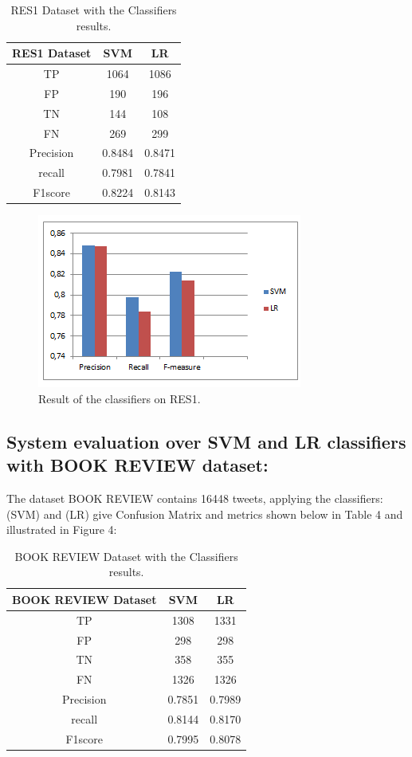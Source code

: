 \documentclass[conference]{IEEEtran}
\begin{document}
\begin{table}[!ht]
	\large        %
	\caption{RES1 Dataset with the Classifiers results.}\label{label}
	\centering    %
	\begin{tabular}{|c|c|c|}
		\hline
		RES1 Dataset&SVM&LR\\     %
		\hline
		TP&1064&1086\\
		\hline
		FP&190&196\\
		\hline
		TN&144&108\\
		\hline
		FN&269&299\\
		\hline
		Precision&0.8484&0.8471\\
		\hline
		recall&0.7981&0.7841\\
		\hline
		F1score&0.8224&0.8143\\
		\hline
	\end{tabular}
\end{table}

\begin{figure}[htbp]
	
	\centerline{\includegraphics{fig3.png}}
	\caption{Result of the classifiers on RES1.}
	\label{fig}
		\end{figure}
\subsection{System evaluation over SVM and LR classifiers with BOOK REVIEW dataset:}\label{AA}
The dataset BOOK REVIEW contains 16448 tweets, applying the classifiers: (SVM) and (LR) give Confusion Matrix and metrics shown below in Table 4 and illustrated in Figure 4:


\begin{table}[!ht]
	\large        %
	\caption{BOOK REVIEW  Dataset with the Classifiers results.}\label{label}
	\centering    %
	\begin{tabular}{|c|c|c|}
		\hline
		BOOK REVIEW Dataset&SVM&LR\\     %
		\hline
		TP&1308&1331\\
		\hline
		FP&298&298\\
		\hline
		TN&358&355\\
		\hline
		FN&1326&1326\\
		\hline
		Precision&0.7851&0.7989\\
		\hline
		recall&0.8144&0.8170\\
		\hline
		F1score&0.7995&0.8078\\
		\hline
	\end{tabular}
\end{table}
\end{document}
